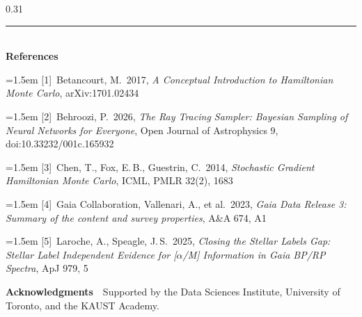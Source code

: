 \documentclass[final]{beamer}
\newcommand{\refitem}[2]{\noindent\hangindent=1.5em\hangafter=1 [#1]~#2\par}
\begin{document}
\begin{frame}[t]
\begin{columns}[t]
\begin{column}{0.31\paperwidth}
{\footnotesize\setlength{\parskip}{0.20\baselineskip}
\noindent\textcolor{uoftblue}{\rule{\linewidth}{0.7mm}}\\[0.35ex]
\textbf{References}\par
\refitem{1}{Betancourt, M.\ 2017, \emph{A Conceptual Introduction to Hamiltonian Monte Carlo}, arXiv:1701.02434}
\refitem{2}{Behroozi, P.\ 2026, \emph{The Ray Tracing Sampler: Bayesian Sampling of Neural Networks for Everyone}, Open Journal of Astrophysics 9, doi:10.33232/001c.165932}
\refitem{3}{Chen, T., Fox, E.\,B., Guestrin, C.\ 2014, \emph{Stochastic Gradient Hamiltonian Monte Carlo}, ICML, PMLR 32(2), 1683}
\refitem{4}{Gaia Collaboration, Vallenari, A., et al.\ 2023, \emph{Gaia Data Release 3: Summary of the content and survey properties}, A\&A 674, A1}
\refitem{5}{Laroche, A., Speagle, J.\,S.\ 2025, \emph{Closing the Stellar Labels Gap: Stellar Label Independent Evidence for [\(\alpha\)/M] Information in Gaia BP/RP Spectra}, ApJ 979, 5}
\vspace{0.30cm}

\noindent\textbf{Acknowledgments}\ \ Supported by the Data Sciences Institute,
University of Toronto, and the KAUST Academy.
}

\end{column}

\end{columns}

\end{frame}
\end{document}
